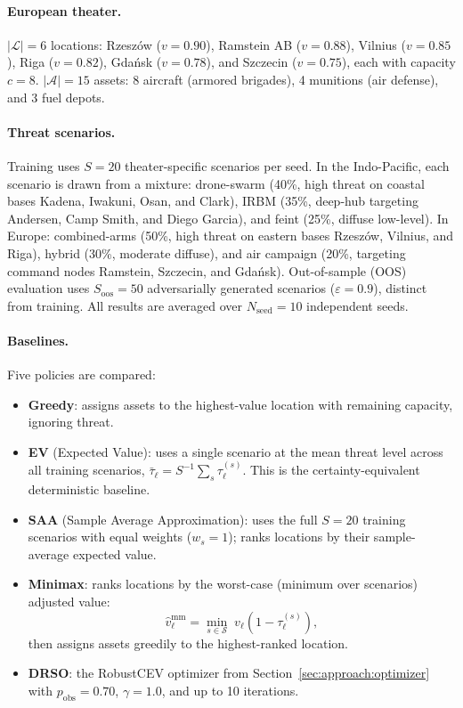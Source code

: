 \documentclass[11pt]{article}
\begin{document}
\paragraph{European theater.}
$|\mathcal{L}| = 6$ locations: Rzesz\'{o}w ($v = 0.90$),
Ramstein AB ($v = 0.88$), Vilnius ($v = 0.85$), Riga ($v = 0.82$),
Gda\'{n}sk ($v = 0.78$), and Szczecin ($v = 0.75$), each with
capacity $c = 8$.
$|\mathcal{A}| = 15$ assets: 8 aircraft (armored brigades),
4 munitions (air defense), and 3 fuel depots.

\paragraph{Threat scenarios.}
Training uses $S = 20$ theater-specific scenarios per seed.
In the Indo-Pacific, each scenario is drawn from a mixture:
drone-swarm (40\%, high threat on coastal bases Kadena, Iwakuni, Osan,
and Clark), IRBM (35\%, deep-hub targeting Andersen, Camp Smith, and
Diego Garcia), and feint (25\%, diffuse low-level).
In Europe: combined-arms (50\%, high threat on eastern bases Rzesz\'{o}w,
Vilnius, and Riga), hybrid (30\%, moderate diffuse), and air campaign
(20\%, targeting command nodes Ramstein, Szczecin, and Gda\'{n}sk).
Out-of-sample (OOS) evaluation uses $S_\mathrm{oos} = 50$ adversarially
generated scenarios ($\varepsilon = 0.9$), distinct from training.
All results are averaged over $N_\mathrm{seed} = 10$ independent seeds.

\paragraph{Baselines.}
Five policies are compared:
\begin{itemize}
    \item \textbf{Greedy}: assigns assets to the highest-value location
          with remaining capacity, ignoring threat.
    \item \textbf{EV} (Expected Value): uses a single scenario at the
          mean threat level across all training scenarios,
          $\bar{\tau}_\ell = S^{-1}\!\sum_s \tau_\ell^{(s)}$.
          This is the certainty-equivalent deterministic baseline.
    \item \textbf{SAA} (Sample Average Approximation): uses the full
          $S = 20$ training scenarios with equal weights ($w_s = 1$);
          ranks locations by their sample-average expected value.
    \item \textbf{Minimax}: ranks locations by the worst-case
          (minimum over scenarios) adjusted value:
          \begin{equation}
              \hat{v}_\ell^{\mathrm{mm}} = \min_{s \in \mathcal{S}}
              \; v_\ell \left(1 - \tau_\ell^{(s)}\right),
              \label{eq:minimax}
          \end{equation}
          then assigns assets greedily to the highest-ranked location.
    \item \textbf{DRSO}: the RobustCEV optimizer from
          Section~\ref{sec:approach:optimizer} with $p_\mathrm{obs} =
          0.70$, $\gamma = 1.0$, and up to 10 iterations.
\end{itemize}
\end{document}
